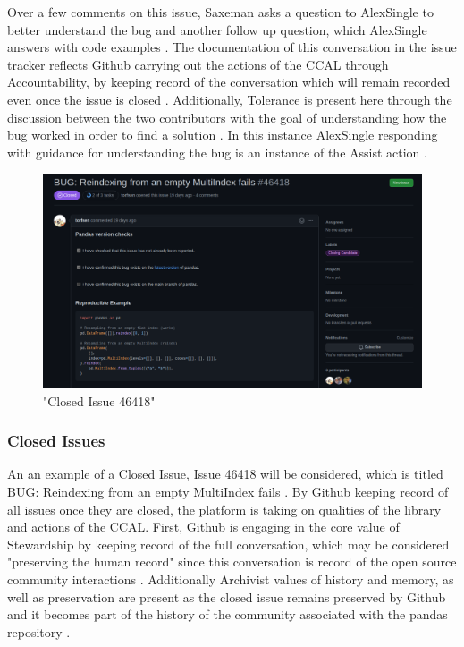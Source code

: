 Over a few comments on this issue, Saxeman asks a question to AlexSingle to better understand the bug and another follow up question, which AlexSingle answers with code examples \cite{pandasrepo}. The documentation of this conversation in the issue tracker reflects Github carrying out the actions of the CCAL through Accountability, by keeping record of the conversation which will remain recorded even once the issue is closed \cite{rubin2016foundationslis}. Additionally, Tolerance is present here through the discussion between the two contributors with the goal of understanding how the bug worked in order to find a solution \cite{rubin2016foundationslis}. In this instance AlexSingle responding with guidance for understanding the bug is an instance of the Assist action \cite{gorman2000values}. 

\begin{figure}[hbt!]
\begin{center}
\includegraphics[width=.8\textwidth]{./images/closed_issue.png}
\caption{"Closed Issue 46418"}
\vspace{0in}
\end{center}
\end{figure}

\subsubsection{Closed Issues}

An an example of a Closed Issue, Issue 46418 will be considered, which is titled BUG: Reindexing from an empty MultiIndex fails \cite{pandasrepo}. By Github keeping record of all issues once they are closed, the platform is taking on qualities of the library and actions of the CCAL. First, Github is engaging in the core value of Stewardship by keeping record of the full conversation, which may be considered "preserving the human record" since this conversation is record of the open source community interactions \cite{gorman2000values}. Additionally Archivist values of history and memory, as well as preservation are present as the closed issue remains preserved by Github and it becomes part of the history of the community associated with the pandas repository \cite{rubin2016foundationslis}.

